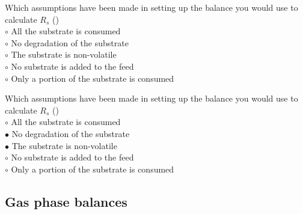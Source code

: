 \documentclass[]{beamer}
\begin{document}
\begin{frame}[shrink] {}
\addtocounter{questions}{1}
\color{blue}
Which assumptions have been made in setting up the balance you would use to calculate $R_s$ ()\\
\color{black}
\setlength{\parindent}{-0.4cm}
{\color{red}$\circ$}   All the substrate is consumed  \\
{\color{red}$\circ$} No degradation of the substrate   \\
{\color{red}$\circ$} The substrate is non-volatile   \\
{\color{red}$\circ$} No substrate is added to the feed  \\
{\color{red}$\circ$} Only a portion of the substrate is consumed
\end{frame}
\begin{frame}[shrink] {}
\addtocounter{answers}{1}
\color{blue}
Which assumptions have been made in setting up the balance you would use to calculate $R_s$ ()\\
\color{black}
\setlength{\parindent}{-0.4cm}
{\color{red}$\circ$}   All the substrate is consumed  \\
{\color{red}$\bullet$} No degradation of the substrate   \\
{\color{red}$\bullet$} The substrate is non-volatile   \\
{\color{red}$\circ$} No substrate is added to the feed  \\
{\color{red}$\circ$} Only a portion of the substrate is consumed
\end{frame}

\subsection{Gas phase balances}
\setcounter{questions}{0}
\setcounter{answers}{0}
\end{document}
